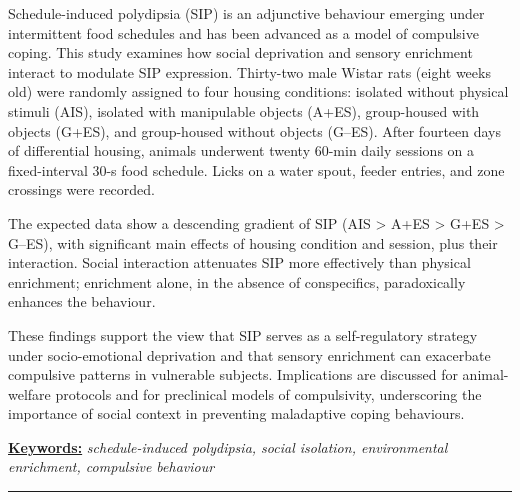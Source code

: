 \documentclass[12pt,a4paper]{article}
\begin{document}
    \begin{center}
    \begin{minipage}{0.9\textwidth}
    \noindent
    Schedule-induced polydipsia (SIP) is an adjunctive behaviour emerging under intermittent food schedules and has been advanced as a model of compulsive coping. This study examines how social deprivation and sensory enrichment interact to modulate SIP expression. Thirty-two male Wistar rats (eight weeks old) were randomly assigned to four housing conditions: isolated without physical stimuli (AIS), isolated with manipulable objects (A+ES), group-housed with objects (G+ES), and group-housed without objects (G--ES). After fourteen days of differential housing, animals underwent twenty 60-min daily sessions on a fixed-interval 30-s food schedule. Licks on a water spout, feeder entries, and zone crossings were recorded.
    
    The expected data show a descending gradient of SIP (AIS > A+ES > G+ES > G--ES), with significant main effects of housing condition and session, plus their interaction. Social interaction attenuates SIP more effectively than physical enrichment; enrichment alone, in the absence of conspecifics, paradoxically enhances the behaviour.

    These findings support the view that SIP serves as a self-regulatory strategy under socio-emotional deprivation and that sensory enrichment can exacerbate compulsive patterns in vulnerable subjects. Implications are discussed for animal-welfare protocols and for preclinical models of compulsivity, underscoring the importance of social context in preventing maladaptive coping behaviours.
    
    \vspace{2mm}
    \noindent
    \underline{\textbf{Keywords:}} \textit{schedule-induced polydipsia, social isolation, environmental enrichment, compulsive behaviour}
    \end{minipage}
    \end{center}
    
    \vspace{3mm}
    
    \begin{center}
    \textcolor{azul}{\rule{150mm}{0.5mm}}
    \end{center}
       

\vspace{15mm}
\end{document}
